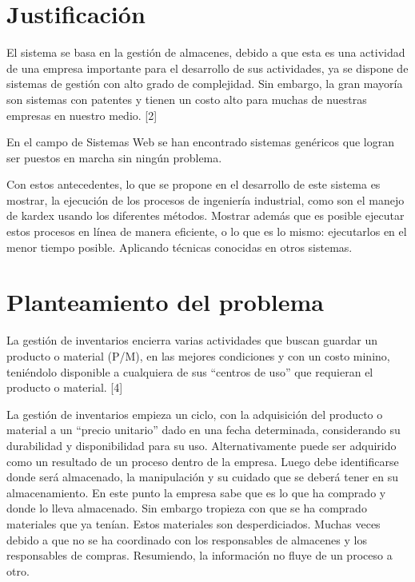 \section{Justificación}

El sistema se basa en la gestión de almacenes, debido a que esta es una actividad de una empresa importante para el desarrollo de sus actividades, ya se dispone de sistemas de gestión con alto grado de complejidad. Sin embargo, la gran mayoría son sistemas con patentes y tienen un costo alto para muchas de nuestras empresas en nuestro medio. [2]

En el campo de Sistemas Web se han encontrado sistemas genéricos que logran ser puestos en marcha sin ningún problema.

Con estos antecedentes,  lo que se propone en el desarrollo de este sistema es mostrar, la ejecución de los procesos de ingeniería industrial, como son el manejo de kardex usando los diferentes métodos. Mostrar además que es posible ejecutar estos procesos en línea de manera eficiente, o lo que es lo mismo: ejecutarlos en el menor tiempo posible. Aplicando técnicas conocidas en otros sistemas.



\section{Planteamiento del problema}

La gestión de inventarios encierra varias actividades que buscan guardar un producto o material (P/M), en las mejores condiciones y con un costo minino, teniéndolo disponible a cualquiera de sus “centros de uso” que requieran el producto o material. [4]

La gestión de inventarios empieza un ciclo, con la adquisición del producto o material a un “precio unitario” dado en una fecha determinada, considerando su durabilidad y disponibilidad para su uso. Alternativamente puede ser adquirido como un resultado de un proceso dentro de la empresa. Luego debe identificarse donde será almacenado, la manipulación y su cuidado que se deberá tener en su almacenamiento. En este punto la empresa sabe que es lo que ha comprado y donde lo lleva almacenado. Sin embargo tropieza con que se ha comprado materiales que ya tenían. Estos materiales son desperdiciados. Muchas veces debido a que no se ha coordinado con los responsables de almacenes y los responsables de compras. Resumiendo, la información no fluye de un proceso a otro.

